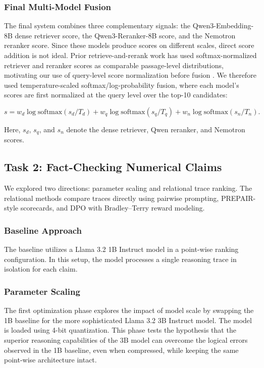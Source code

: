 \documentclass[
]{ceurart}
\begin{document}
\subsubsection{Final Multi-Model Fusion}

The final system combines three complementary signals: the Qwen3-Embedding-8B dense retriever score, the Qwen3-Reranker-8B score, and the Nemotron reranker score. Since these models produce scores on different scales, direct score addition is not ideal. Prior retrieve-and-rerank work has used softmax-normalized retriever and reranker scores as comparable passage-level distributions, motivating our use of query-level score normalization before fusion \cite{glass-etal-2022-re2g}. We therefore used temperature-scaled softmax/log-probability fusion, where each model's scores are first normalized at the query level over the top-10 candidates:

\[
s = w_d \log \mathrm{softmax}(s_d/T_d) +
    w_q \log \mathrm{softmax}(s_q/T_q) +
    w_n \log \mathrm{softmax}(s_n/T_n).
\]

Here, $s_d$, $s_q$, and $s_n$ denote the dense retriever, Qwen reranker, and Nemotron scores.

\subsection{Task 2: Fact-Checking Numerical Claims}
We explored two directions: parameter scaling and relational trace ranking. The relational methods compare traces directly using pairwise prompting, PREPAIR-style scorecards, and DPO with Bradley--Terry reward modeling.

\subsubsection{Baseline Approach}
The baseline utilizes a Llama 3.2 1B Instruct model in a point-wise ranking configuration. In this setup, the model processes a single reasoning trace in isolation for each claim. 

\subsubsection{Parameter Scaling}
The first optimization phase explores the impact of model scale by swapping the 1B baseline for the more sophisticated Llama 3.2 3B Instruct model. The model is loaded using 4-bit quantization. This phase tests the hypothesis that the superior reasoning capabilities of the 3B model can overcome the logical errors observed in the 1B baseline, even when compressed, while keeping the same point-wise architecture intact.
\end{document}
